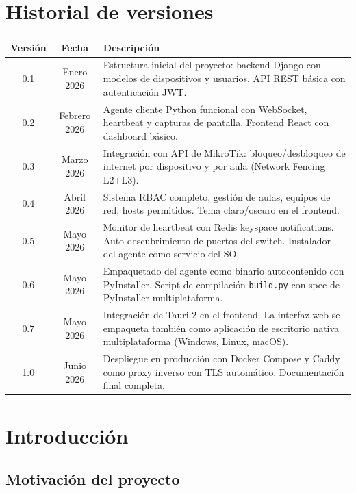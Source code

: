\documentclass[12pt, a4paper, twoside]{article}
\begin{document}
\section*{Historial de versiones}
\begin{tabularx}{\textwidth}{ccX}
  \toprule
  \textbf{Versión} & \textbf{Fecha} & \textbf{Descripción} \\
  \midrule
  0.1 & Enero 2026  & Estructura inicial del proyecto: backend Django con modelos de dispositivos y usuarios, API REST básica con autenticación JWT. \\
  0.2 & Febrero 2026 & Agente cliente Python funcional con WebSocket, heartbeat y capturas de pantalla. Frontend React con dashboard básico. \\
  0.3 & Marzo 2026   & Integración con API de MikroTik: bloqueo/desbloqueo de internet por dispositivo y por aula (Network Fencing L2+L3). \\
  0.4 & Abril 2026   & Sistema RBAC completo, gestión de aulas, equipos de red, hosts permitidos. Tema claro/oscuro en el frontend. \\
  0.5 & Mayo 2026    & Monitor de heartbeat con Redis keyspace notifications. Auto-descubrimiento de puertos del switch. Instalador del agente como servicio del SO. \\
  0.6 & Mayo 2026    & Empaquetado del agente como binario autocontenido con PyInstaller. Script de compilación \texttt{build.py} con spec de PyInstaller multiplataforma. \\
  0.7 & Mayo 2026    & Integración de Tauri 2 en el frontend. La interfaz web se empaqueta también como aplicación de escritorio nativa multiplataforma (Windows, Linux, macOS). \\
  1.0 & Junio 2026   & Despliegue en producción con Docker Compose y Caddy como proxy inverso con TLS automático. Documentación final completa. \\
  \bottomrule
\end{tabularx}

\newpage
\tableofcontents
\newpage

\section{Introducción}

\subsection{Motivación del proyecto}
\end{document}
